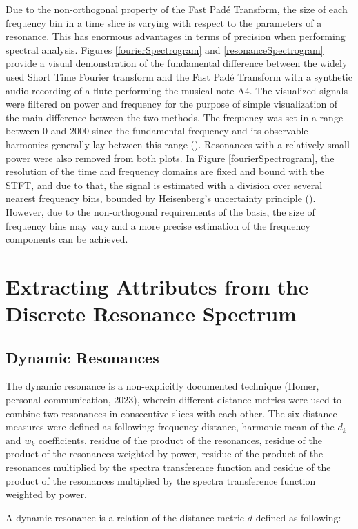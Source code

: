 Due to the non-orthogonal property of the Fast Padé Transform, the size of each frequency bin in a time slice is varying with respect to the parameters of a resonance. This has enormous advantages in terms of precision when performing spectral analysis. Figures \ref{fourierSpectrogram} and \ref{resonanceSpectrogram} provide a visual demonstration of the fundamental difference between the widely used Short Time Fourier transform and the Fast Padé Transform with a synthetic audio recording of a flute performing the musical note A4. The visualized signals were filtered on power and frequency for the purpose of simple visualization of the main difference between the two methods. The frequency was set in a range between 0 and 2000 since the fundamental frequency and its observable harmonics generally lay between this range (\cite{huang_resonance-based_2017}). Resonances with a relatively small power were also removed from both plots.
In Figure \ref{fourierSpectrogram}, the resolution of the time and frequency domains are fixed and bound with the STFT, and due to that, the signal is estimated with a division over several nearest frequency bins, bounded by Heisenberg's uncertainty principle (\cite{folland_uncertainty_1997}). However, due to the non-orthogonal requirements of the basis, the size of frequency bins may vary and a more precise estimation of the frequency components can be achieved.


 \section{Extracting Attributes from the Discrete Resonance Spectrum}
 \subsection{Dynamic Resonances}
 The dynamic resonance is a non-explicitly documented technique (Homer, personal communication, 2023), wherein different distance metrics were used to combine two resonances in consecutive slices with each other. The six distance measures were defined as following: frequency distance, harmonic mean of the $d_k$ and $w_k$ coefficients, residue of the product of the resonances, residue of the product of the resonances weighted by power, residue of the product of the resonances multiplied by the spectra transference function and residue of the product of the resonances multiplied by the spectra transference function weighted by power.

A dynamic resonance is a relation of the distance metric $d$ defined as following:



